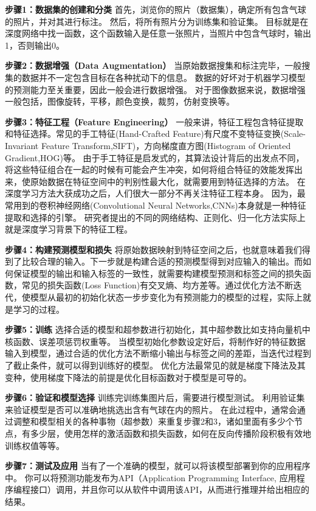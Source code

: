 \textbf{步骤1：数据集的创建和分类} ​
首先，浏览你的照片（数据集），确定所有包含气球的照片，并对其进行标注。
然后，将所有照片分为训练集和验证集。
目标就是在深度网络中找一函数，这个函数输入是任意一张照片，当照片中包含气球时，输出1，否则输出0。

\textbf{步骤2：数据增强（Data Augmentation）} ​
当原始数据搜集和标注完毕，一般搜集的数据并不一定包含目标在各种扰动下的信息。
数据的好坏对于机器学习模型的预测能力至关重要，因此一般会进行数据增强。
对于图像数据来说，数据增强一般包括，图像旋转，平移，颜色变换，裁剪，仿射变换等。

\textbf{步骤3：特征工程（Feature Engineering）} ​
一般来讲，特征工程包含特征提取和特征选择。常见的手工特征(Hand-Crafted Feature)有尺度不变特征变换(Scale-Invariant Feature Transform,SIFT)，方向梯度直方图(Histogram of Oriented Gradient,HOG)等。
由于手工特征是启发式的，其算法设计背后的出发点不同，将这些特征组合在一起的时候有可能会产生冲突，如何将组合特征的效能发挥出来，使原始数据在特征空间中的判别性最大化，就需要用到特征选择的方法。
在深度学习方法大获成功之后，人们很大一部分不再关注特征工程本身。
因为，最常用到的卷积神经网络(Convolutional Neural Networks,CNNs)本身就是一种特征提取和选择的引擎。
研究者提出的不同的网络结构、正则化、归一化方法实际上就是深度学习背景下的特征工程。

\textbf{步骤4：构建预测模型和损失} ​
将原始数据映射到特征空间之后，也就意味着我们得到了比较合理的输入。下一步就是构建合适的预测模型得到对应输入的输出。而如何保证模型的输出和输入标签的一致性，就需要构建模型预测和标签之间的损失函数，常见的损失函数(Loss
Function)有交叉熵、均方差等。通过优化方法不断迭代，使模型从最初的初始化状态一步步变化为有预测能力的模型的过程，实际上就是学习的过程。

\textbf{步骤5：训练} ​
选择合适的模型和超参数进行初始化，其中超参数比如支持向量机中核函数、误差项惩罚权重等。
当模型初始化参数设定好后，将制作好的特征数据输入到模型，通过合适的优化方法不断缩小输出与标签之间的差距，当迭代过程到了截止条件，就可以得到训练好的模型。
优化方法最常见的就是梯度下降法及其变种，使用梯度下降法的前提是优化目标函数对于模型是可导的。

\textbf{步骤6：验证和模型选择} ​
训练完训练集图片后，需要进行模型测试。
利用验证集来验证模型是否可以准确地挑选出含有气球在内的照片。
​
在此过程中，通常会通过调整和模型相关的各种事物（超参数）来重复步骤2和3，诸如里面有多少个节点，有多少层，使用怎样的激活函数和损失函数，如何在反向传播阶段积极有效地训练权值等等。

\textbf{步骤7：测试及应用} ​
当有了一个准确的模型，就可以将该模型部署到你的应用程序中。
你可以将预测功能发布为API（Application Programming Interface, 应用程序编程接口）调用，并且你可以从软件中调用该API，从而进行推理并给出相应的结果。

